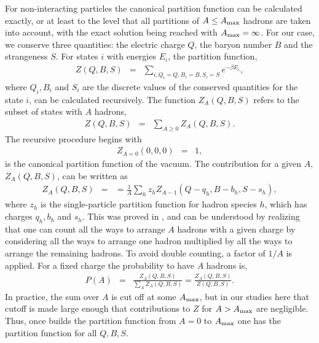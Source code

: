 \documentclass[aps,prc,nofootinbib,showpacs,superscriptaddress,groupedaddress]{revtex4-1}
\begin{document}
For non-interacting particles the canonical partition function can be calculated exactly, or at least to the level that all partitions of $A\le A_{\rm max}$ hadrons are taken into account, with the exact solution being reached with $A_{\rm max}=\infty$. For our case, we conserve three quantities: the electric charge $Q$, the baryon number $B$ and the strangeness $S$. For states $i$ with energies $E_i$, the partition function,
\begin{eqnarray}
Z(Q,B,S)&=&\sum_{i,Q_i=Q,B_i=B,S_i=S}e^{-\beta E_i},
\end{eqnarray}
where $Q_i,B_i$ and $S_i$ are the discrete values of the conserved quantities for the state $i$, can be calculated recursively. The function $Z_A(Q,B,S)$ refers to the subset of states with $A$ hadrons,
\begin{eqnarray}
Z(Q,B,S)&=&\sum_{A\ge 0}Z_A(Q,B,S).
\end{eqnarray}
The recursive procedure begins with
\begin{eqnarray}
Z_{A=0}(0,0,0)&=&1,
\end{eqnarray}
is the canonical partition function of the vacuum. The contribution for a given $A$, $Z_A(Q,B,S)$, can be written as 
\begin{eqnarray}\label{eq:recurrence}
Z_A(Q,B,S)&=&=\frac{1}{A}\sum_h z_hZ_{A-1}(Q-q_h,B-b_h,S-s_h),
\end{eqnarray}
where $z_h$ is the single-particle partition function for hadron species $h$, which has charges $q_h,b_h$ and $s_h$. This was proved in \cite{Pratt:1999ht}, and can be understood by realizing that one can count all the ways to arrange $A$ hadrons with a given charge by considering all the ways to arrange one hadron multiplied by all the ways to arrange the remaining hadrons. To avoid double counting, a factor of $1/A$ is applied. For a fixed charge the probability to have $A$ hadrons is,
\begin{eqnarray}
P(A)&=&\frac{Z_A(Q,B,S)}{\sum_A Z_A(Q,B,S)}=\frac{Z_A(Q,B,S)}{Z(Q,B,S)}.
\end{eqnarray}
In practice, the sum over $A$ is cut off at some $A_{\rm max}$, but in our studies here that cutoff is made large enough that contributions to $Z$ for $A>A_{\rm max}$ are negligible. Thus, once builds the partition function from $A=0$ to $A_{\rm max}$ one has the partition function for all $Q,B,S$. 
\end{document}
